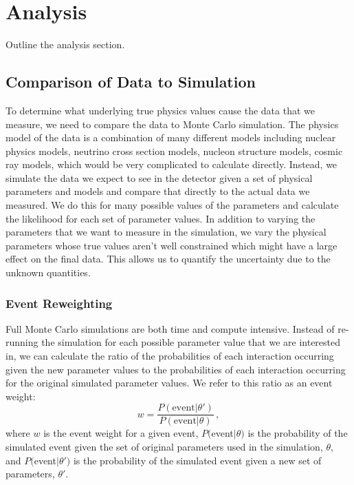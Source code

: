 \section{Analysis}\label{sec:analysis}
\hspace{\parindent}
Outline the analysis section.

\subsection{Comparison of Data to Simulation}
  To determine what underlying true physics values cause the data that we
  measure, we need to compare the data to Monte Carlo simulation. The physics
  model of the data is a combination of many different models including nuclear
  physics models, neutrino cross section models, nucleon structure models,
  cosmic ray models, which would be very complicated to calculate directly.
  Instead, we simulate the data we expect to see in the detector given a set of
  physical parameters and models and compare that directly to the actual data
  we measured. We do this for many possible values of the parameters and
  calculate the likelihood for each set of parameter values. In addition to
  varying the parameters that we want to measure in the simulation, we vary the
  physical parameters whose true values aren't well constrained which might
  have a large effect on the final data. This allows us to quantify the
  uncertainty due to the unknown quantities.
  \subsubsection{Event Reweighting}\label{sec:reweighting}
    Full Monte Carlo simulations are both time and compute intensive. Instead
    of re-running the simulation for each possible parameter value that we are
    interested in, we can calculate the ratio of the probabilities of each
    interaction occurring given the new parameter values to the probabilities
    of each interaction occurring for the original simulated parameter values.
    We refer to this ratio as an event weight:
    \begin{equation}
      w = \frac{P(\textrm{event}|\theta')}{P(\textrm{event}|\theta)} \,,
    \end{equation}
    where $w$ is the event weight for a given event, $P($event$|\theta)$ is the
    probability of the simulated event given the set of original parameters
    used in the simulation, $\theta$, and $P($event$|\theta')$ is the
    probability of the simulated event given a new set of parameters,
    $\theta'$.

